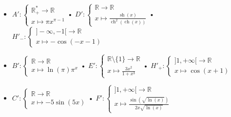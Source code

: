 \documentclass[10pt]{article}
\DeclareMathOperator{\ch}{ch}
\DeclareMathOperator{\sh}{sh}
\begin{document}
\begin{tcolorbox}[enhanced, width=7in, center, size=fbox, fontupper=\large, drop shadow southwest]
    \begin{itemize}
        \item $A':\begin{cases}\mathbb{R}^*_+\rightarrow\mathbb{R}\\x\mapsto\pi x^{\pi-1}\end{cases}$\hspace{1.8cm}• $D':\begin{cases}\mathbb{R}\rightarrow\mathbb{R}\\x\mapsto\frac{\sh(x)}{\ch^2(\ch(x))}\end{cases}$\hspace{1.6cm}• $H'_-:\begin{cases}]-\infty,-1[\rightarrow\mathbb{R}\\x\mapsto-\cos(-x-1)\end{cases}$
        \item $B':\begin{cases}\mathbb{R}\rightarrow\mathbb{R}\\x\mapsto\ln(\pi)\pi^x\end{cases}$\hspace{1.5cm}• $E':\begin{cases}\mathbb{R}\setminus\{1\}\rightarrow\mathbb{R}\\x\mapsto\frac{3x^2}{1+x^3}\end{cases}$\hspace{1.6cm}• $H'_+:\begin{cases}]1,+\infty[\rightarrow\mathbb{R}\\x\mapsto\cos(x+1)\end{cases}$
        \item $C':\begin{cases}\mathbb{R}\rightarrow\mathbb{R}\\x\mapsto-5\sin(5x)\end{cases}$\hspace{1.0cm}• $F':\begin{cases}]1,+\infty[\rightarrow\mathbb{R}\\x\mapsto\frac{\sin(\sqrt{\ln(x)})}{2x\sqrt{\ln(x)}}\end{cases}$
    \end{itemize}
\end{tcolorbox}
\end{document}
